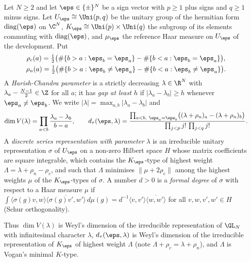 \begin{definition}\label{pf:sh-curv:dsdef}
Let $N\ge2$ and let $\eps\in\{\pm\}^N$ be a sign vector with $p\ge1$ plus signs and $q\ge1$ minus signs. Let
$U_\eps\cong\Uni(p,q)$ be the unitary group of the hermitian form $\mathrm{diag}(\eps)$ on $\C^N$, $K_\eps\cong\Uni(p)\times
\Uni(q)$ the subgroup of its elements commuting with $\mathrm{diag}(\eps)$, and $\mu_\eps$ the reference Haar measure on
$U_\eps$ of the development. Put
\begin{gather*}
\rho_c(a)=\tfrac12\bigl(\#\{b>a:\eps_b=\eps_a\}-\#\{b<a:\eps_b=\eps_a\}\bigr),\\
\rho_n(a)=\tfrac12\bigl(\#\{b>a:\eps_b\ne\eps_a\}-\#\{b<a:\eps_b\ne\eps_a\}\bigr).
\end{gather*}
A \emph{Harish-Chandra parameter} is a strictly decreasing $\lambda\in\R^N$ with $\lambda_a-\frac{N-1}2\in\Z$ for all
$a$; it has \emph{gap at least $h$} if $|\lambda_a-\lambda_b|\ge h$ whenever $\eps_a\ne\eps_b$. We write
$|\lambda|=\max_{a,b}|\lambda_a-\lambda_b|$ and
\[
\dim V(\lambda)=\prod_{a<b}\frac{\lambda_a-\lambda_b}{b-a},\qquad
\shcurvDt(\eps,\lambda)=\frac{\prod_{a<b,\ \eps_a=\eps_b}\bigl((\lambda+\rho_n)_a-(\lambda+\rho_n)_b\bigr)}
{\prod_{j<p}j!\,\prod_{j<q}j!}.
\]
A \emph{discrete series representation with parameter $\lambda$} is an irreducible unitary representation $\sigma$ of
$U_\eps$ on a non-zero Hilbert space $H$ whose matrix coefficients are square integrable, which contains the $K_\eps$-type
of highest weight $\Lambda=\lambda+\rho_n-\rho_c$, and such that $\Lambda$ minimises $\|\mu+2\rho_c\|$ among the highest
weights $\mu$ of the $K_\eps$-types of $\sigma$. A number $d>0$ is a \emph{formal degree} of $\sigma$ with respect to a Haar
measure $\mu$ if $\int\langle\sigma(g)v,w\rangle\overline{\langle\sigma(g)v',w'\rangle}\,d\mu(g)=d^{-1}\langle v,v'\rangle
\overline{\langle w,w'\rangle}$ for all $v,w,v',w'\in H$ (Schur orthogonality).
\end{definition}

Thus $\dim V(\lambda)$ is Weyl's dimension of the irreducible representation of $\GL_N$ with infinitesimal character
$\lambda$, $\shcurvDt(\eps,\lambda)$ is Weyl's dimension of the irreducible representation of $K_\eps$ of highest weight
$\Lambda$ (note $\Lambda+\rho_c=\lambda+\rho_n$), and $\Lambda$ is Vogan's minimal $K$-type.

